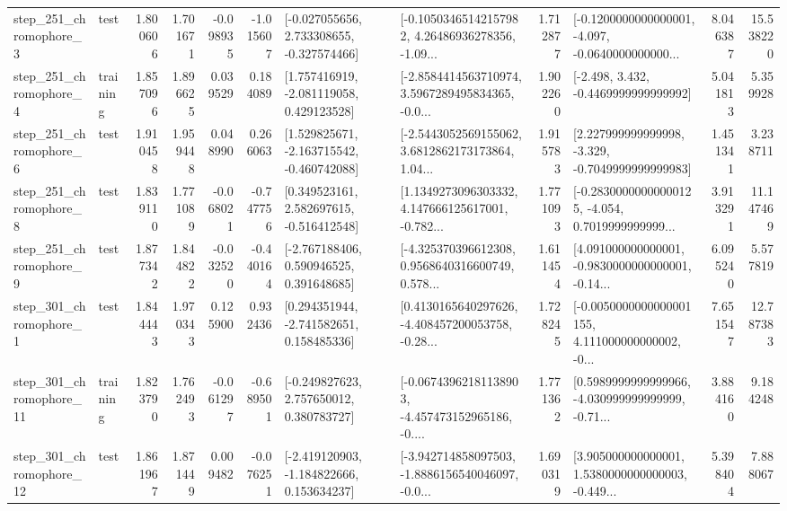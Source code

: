 \begin{tabular}{llrrrrllrlrr}
   step\_251\_chromophore\_3 &      test &      1.800606 &    1.701671 &     -0.098935 & -1.015607 &   [-0.027055656, 2.733308655, -0.327574466] &  [-0.10503465142157982, 4.26486936278356, -1.09... &       1.712877 &  [-0.1200000000000001, -4.097, -0.0640000000000... &            8.046387 &         15.538220 \\
   step\_251\_chromophore\_4 &  training &      1.857096 &    1.896625 &      0.039529 &  0.184089 &    [1.757416919, -2.081119058, 0.429123528] &  [-2.8584414563710974, 3.5967289495834365, -0.0... &       1.902260 &               [-2.498, 3.432, -0.4469999999999992] &            5.041813 &          5.359928 \\
   step\_251\_chromophore\_6 &      test &      1.910458 &    1.959448 &      0.048990 &  0.266063 &   [1.529825671, -2.163715542, -0.460742088] &  [-2.5443052569155062, 3.6812862173173864, 1.04... &       1.915783 &   [2.227999999999998, -3.329, -0.7049999999999983] &            1.451341 &          3.238711 \\
   step\_251\_chromophore\_8 &      test &      1.839110 &    1.771089 &     -0.068021 & -0.747756 &    [0.349523161, 2.582697615, -0.516412548] &  [1.1349273096303332, 4.147666125617001, -0.782... &       1.771093 &  [-0.28300000000000125, -4.054, 0.7019999999999... &            3.913291 &         11.147469 \\
   step\_251\_chromophore\_9 &      test &      1.877342 &    1.844822 &     -0.032520 & -0.440164 &    [-2.767188406, 0.590946525, 0.391648685] &  [-4.325370396612308, 0.9568640316600749, 0.578... &       1.611454 &  [4.091000000000001, -0.9830000000000001, -0.14... &            6.095240 &          5.577819 \\
   step\_301\_chromophore\_1 &      test &      1.844443 &    1.970343 &      0.125900 &  0.932436 &    [0.294351944, -2.741582651, 0.158485336] &  [0.4130165640297626, -4.408457200053758, -0.28... &       1.728245 &  [-0.0050000000000001155, 4.111000000000002, -0... &            7.651547 &         12.787383 \\
  step\_301\_chromophore\_11 &  training &      1.823790 &    1.762493 &     -0.061297 & -0.689501 &    [-0.249827623, 2.757650012, 0.380783727] &  [-0.06743962181138903, -4.457473152965186, -0.... &       1.771362 &  [0.5989999999999966, -4.030999999999999, -0.71... &            3.884160 &          9.184248 \\
  step\_301\_chromophore\_12 &      test &      1.861967 &    1.871449 &      0.009482 & -0.076251 &   [-2.419120903, -1.184822666, 0.153634237] &  [-3.942714858097503, -1.8886156540046097, -0.0... &       1.690319 &  [3.905000000000001, 1.5380000000000003, -0.449... &            5.398404 &          7.888067 \\

\end{tabular}
